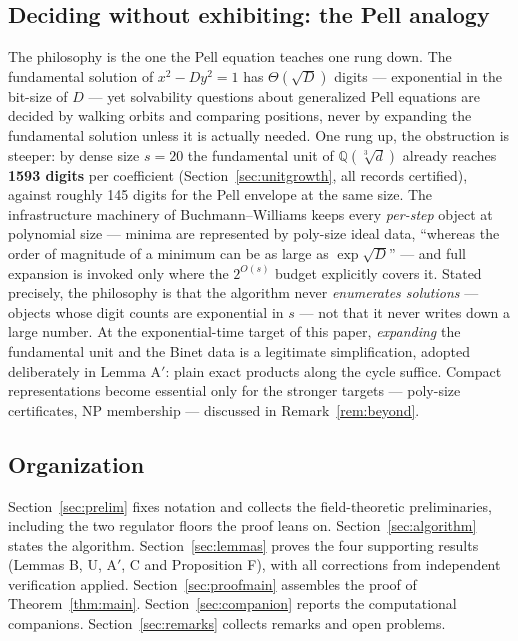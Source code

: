 \documentclass[11pt]{amsart}
\theoremstyle{plain}
\theoremstyle{remark}
\begin{document}
\subsection{Deciding without exhibiting: the Pell analogy}
\label{sec:pell}

The philosophy is the one the Pell equation teaches one rung down. The
fundamental solution of $x^2 - Dy^2 = 1$ has $\Theta(\sqrt{D})$ digits
--- exponential in the bit-size of $D$ --- yet solvability questions
about generalized Pell equations are decided by walking orbits and
comparing positions, never by expanding the fundamental solution
unless it is actually needed. One rung up, the obstruction is steeper:
by dense size $s = 20$ the fundamental unit of
$\mathbb{Q}(\sqrt[3]{d})$ already reaches \textbf{1593 digits} per
coefficient (Section~\ref{sec:unitgrowth}, all records certified),
against roughly 145 digits for the Pell envelope at the same size. The
infrastructure machinery of Buchmann--Williams \cite{BW88} keeps every
\emph{per-step} object at polynomial size --- minima are represented
by poly-size ideal data, ``whereas the order of magnitude of a minimum
can be as large as $\exp\sqrt{D}$'' \cite[Prop.~2.11]{BW88} --- and
full expansion is invoked only where the $2^{O(s)}$ budget explicitly
covers it. Stated precisely, the philosophy is that the algorithm
never \emph{enumerates solutions} --- objects whose digit counts are
exponential in $s$ --- not that it never writes down a large number.
At the exponential-time target of this paper, \emph{expanding} the
fundamental unit and the Binet data is a legitimate simplification,
adopted deliberately in Lemma A$'$: plain exact products along the
cycle suffice. Compact representations become essential only for the
stronger targets --- poly-size certificates, NP membership ---
discussed in Remark~\ref{rem:beyond}.

\subsection{Organization}\label{sec:organization}

Section~\ref{sec:prelim} fixes notation and collects the
field-theoretic preliminaries, including the two regulator floors the
proof leans on. Section~\ref{sec:algorithm} states the algorithm.
Section~\ref{sec:lemmas} proves the four supporting results (Lemmas B,
U, A$'$, C and Proposition F), with all corrections from independent
verification applied. Section~\ref{sec:proofmain} assembles the proof of
Theorem~\ref{thm:main}. Section~\ref{sec:companion} reports the
computational companions. Section~\ref{sec:remarks} collects remarks
and open problems.
\end{document}
